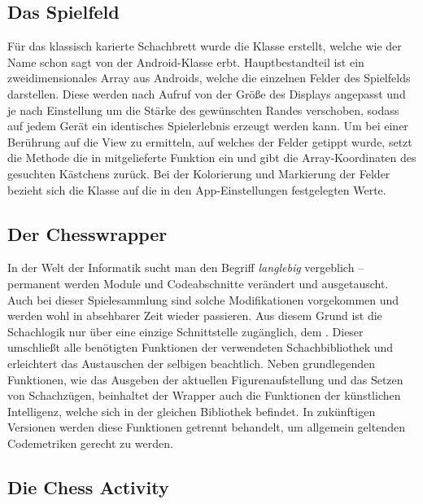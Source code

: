 \subsection{Das Spielfeld}

Für das klassisch karierte Schachbrett wurde die Klasse
 erstellt, welche wie der Name schon sagt von der
Android-Klasse  erbt. Hauptbestandteil ist ein zweidimensionales
Array aus Androids, welche die einzelnen Felder des Spielfelds
darstellen. Diese werden nach Aufruf von  der Größe des
Displays angepasst und je nach Einstellung um die Stärke des gewünschten Randes
verschoben, sodass auf jedem Gerät ein identisches Spielerlebnis erzeugt werden
kann. Um bei einer Berührung auf die View zu ermitteln, auf welches der Felder
getippt wurde, setzt die Methode  die in
 mitgelieferte Funktion  ein und gibt
die Array-Koordinaten des gesuchten Kästchens zurück. Bei der Kolorierung und
Markierung der Felder bezieht sich die Klasse auf die in den App-Einstellungen
festgelegten Werte.

\subsection{Der Chesswrapper}

In der Welt der Informatik sucht man den Begriff \emph{langlebig} vergeblich --
permanent werden Module und Codeabschnitte verändert und ausgetauscht. Auch bei
dieser Spielesammlung sind solche Modifikationen vorgekommen und werden wohl in
absehbarer Zeit wieder passieren. Aus diesem Grund ist die Schachlogik nur über
eine einzige Schnittstelle zugänglich, dem . Dieser
umschließt alle benötigten Funktionen der verwendeten Schachbibliothek und
erleichtert das Austauschen der selbigen beachtlich. Neben grundlegenden
Funktionen, wie das Ausgeben der aktuellen Figurenaufstellung und das Setzen
von Schachzügen, beinhaltet der Wrapper auch die Funktionen der künstlichen
Intelligenz, welche sich in der gleichen Bibliothek befindet. In zukünftigen
Versionen werden diese Funktionen getrennt behandelt, um allgemein geltenden
Codemetriken gerecht zu werden. 

\subsection{Die Chess Activity}

